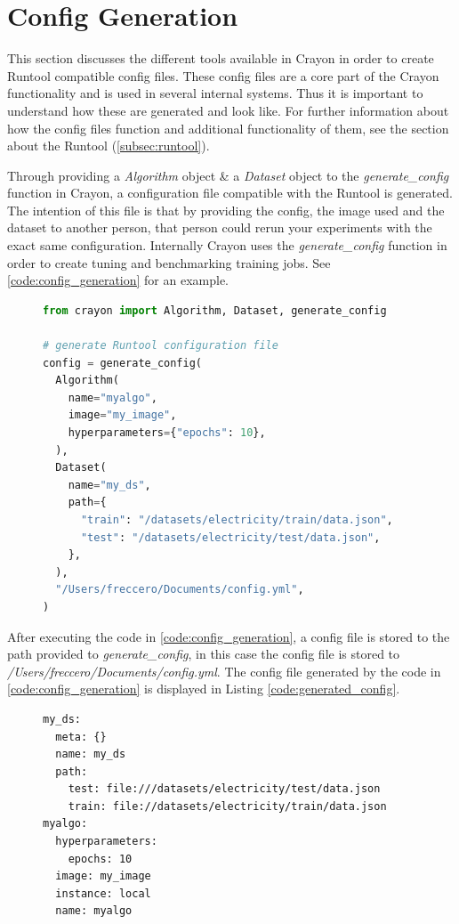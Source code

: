 \section{Config Generation}
\label{'subsub:config_generation'}
This section discusses the different tools available in Crayon in order to create Runtool compatible config files. These config files are a core part of the Crayon functionality and is used in several internal systems. Thus it is important to understand how these are generated and look like. For further information about how the config files function and additional functionality of them, see the section about the Runtool (\ref{subsec:runtool}).

Through providing a \textit{Algorithm} object \& a \textit{Dataset} object to the \textit{generate\_config} function in Crayon, a configuration file compatible with the Runtool is generated. The intention of this file is that by providing the config, the image used and the dataset to another person, that person could rerun your experiments with the exact same configuration. Internally Crayon uses the \textit{generate\_config} function in order to create tuning and benchmarking training jobs. See \ref{code:config_generation} for an example.
\begin{figure}
  \begin{lstlisting}[language=Python, label={code:config_generation}, caption={Config generation using Crayon}]
from crayon import Algorithm, Dataset, generate_config

# generate Runtool configuration file
config = generate_config(
  Algorithm(
    name="myalgo",
    image="my_image",
    hyperparameters={"epochs": 10},
  ),
  Dataset(
    name="my_ds",
    path={
      "train": "/datasets/electricity/train/data.json",
      "test": "/datasets/electricity/test/data.json",
    },
  ),
  "/Users/freccero/Documents/config.yml",
)
\end{lstlisting}
\end{figure}

After executing the code in \ref{code:config_generation}, a config file is stored to the path provided to \textit{generate\_config}, in this case the config file is stored to \textit{/Users/freccero/Documents/config.yml}. The config file generated by the code in \ref{code:config_generation} is displayed in Listing \ref{code:generated_config}.
\begin{figure}
  \begin{lstlisting}[label={code:generated_config}, caption={Generated configurations file.}]
my_ds:
  meta: {}
  name: my_ds
  path:
    test: file:///datasets/electricity/test/data.json
    train: file://datasets/electricity/train/data.json
myalgo:
  hyperparameters:
    epochs: 10
  image: my_image
  instance: local
  name: myalgo
\end{lstlisting}
\end{figure}


